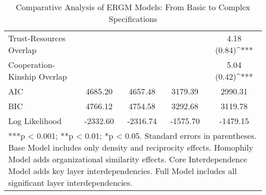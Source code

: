 \begin{table}
\begin{center}
\begin{tabular}{l cccc}
Trust-Resources Overlap       &                       &                       &                       & 4.18 \; (0.84)^{***}  \\
Cooperation-Kinship Overlap   &                       &                       &                       & 5.04 \; (0.42)^{***}  \\
\hline
AIC                           & 4685.20               & 4657.48               & 3179.39               & 2990.31               \\
BIC                           & 4766.12               & 4754.58               & 3292.68               & 3119.78               \\
Log Likelihood                & -2332.60              & -2316.74              & -1575.70              & -1479.15              \\
\hline
\multicolumn{5}{l}{\scriptsize{***p < 0.001; **p < 0.01; *p < 0.05. Standard errors in parentheses.
       Base Model includes only density and reciprocity effects. 
       Homophily Model adds organizational similarity effects.
       Core Interdependence Model adds key layer interdependencies.
       Full Model includes all significant layer interdependencies.}}
\end{tabular}
\caption{Comparative Analysis of ERGM Models: From Basic to Complex Specifications}
\label{tab:ergm_comparative}
\end{center}
\end{table}
